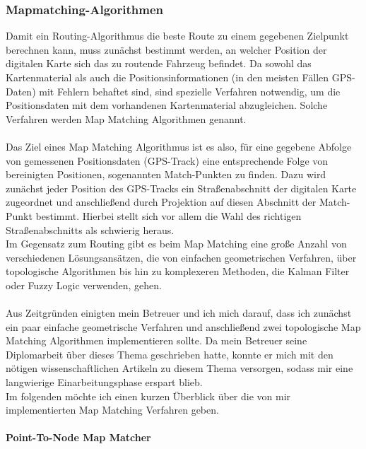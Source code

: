 \documentclass[a4paper]{scrartcl}
\begin{document}
\subsubsection{Mapmatching-Algorithmen}
\label{sec:mapm-algor}

Damit ein Routing-Algorithmus die beste Route zu einem gegebenen Zielpunkt berechnen kann, muss zunächst bestimmt werden, an welcher Position der digitalen Karte sich das zu routende Fahrzeug befindet. Da sowohl das Kartenmaterial als auch die Positionsinformationen (in den meisten Fällen GPS-Daten) mit Fehlern behaftet sind, sind spezielle Verfahren notwendig, um die Positionsdaten mit dem vorhandenen Kartenmaterial abzugleichen. Solche Verfahren werden Map Matching  Algorithmen genannt. 
\\\\
Das Ziel eines Map Matching Algorithmus ist es also, für eine gegebene Abfolge von gemessenen Positionsdaten (GPS-Track) eine entsprechende Folge von bereinigten Positionen, sogenannten Match-Punkten zu finden. Dazu wird zunächst jeder Position des GPS-Tracks ein Straßenabschnitt der digitalen Karte zugeordnet und anschließend durch Projektion auf diesen Abschnitt der Match-Punkt bestimmt. Hierbei stellt sich vor allem die Wahl des richtigen Straßenabschnitts als schwierig heraus. \\
Im Gegensatz zum Routing gibt es beim Map Matching eine große Anzahl von verschiedenen Lösungsansätzen, die von einfachen geometrischen Verfahren, über topologische Algorithmen bis hin zu komplexeren Methoden, die Kalman Filter oder Fuzzy Logic verwenden, gehen. 
\\\\
Aus Zeitgründen einigten mein Betreuer und ich mich darauf, dass ich zunächst ein paar einfache geometrische Verfahren und anschließend zwei topologische Map Matching Algorithmen implementieren sollte. Da mein Betreuer seine Diplomarbeit über dieses Thema geschrieben hatte, konnte er mich mit den nötigen wissenschaftlichen Artikeln zu diesem Thema versorgen, sodass mir eine langwierige Einarbeitungsphase erspart blieb.\\
Im folgenden möchte ich einen kurzen Überblick über die von mir implementierten Map Matching Verfahren geben. 


\paragraph{Point-To-Node Map Matcher} 
\label{sec:point-node-map}
\end{document}
